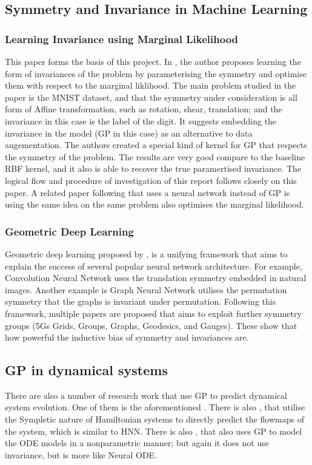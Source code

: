 \documentclass{statsmsc}
\begin{document}
\subsection{Symmetry and Invariance in Machine Learning}

\subsubsection{Learning Invariance using Marginal Likelihood}
This paper forms the basis of this project.
In \cite{Mark2017}, the author proposes learning the form of invariances of the problem by parameterising the symmetry and optimise them with respect to the marginal liklihood.
The main problem studied in the paper is the MNIST dataset, and that the symmetry under consideration is all form of Affine transformation, such as rotation, shear, translation; and the invariance in this case is the label of the digit. 
It suggests embedding the invariance in the model (GP in this case) as an alternative to data augementation.
The authors created a special kind of kernel for GP that respects the symmetry of the problem.
The results are very good compare to the baseline RBF kernel, and it also is able to recover the true paramertised invariance. 
The logical flow and procedure of investigation of this report follows closely on this paper. 
A related paper following that uses a neural network instead of GP is \cite{Tycho2021} using the same idea on the same problem also optimises the marginal likelihood.

\subsubsection{Geometric Deep Learning}
Geometric deep learning proposed by \cite{Bronstein2017}, is a unifying framework that aims to explain the success of several popular neural network architecture. 
For example, Convolution Neural Network uses the translation symmetry embedded in natural images. 
Another example is Graph Neural Network utilises the permutation symmetry that the graphs is invariant under permutation.
Following this framework, multiple papers are proposed that aims to exploit further symmetry groups (5Gs Grids, Groups, Graphs, Geodesics, and Gauges).
These show that how powerful the inductive bias of symmetry and invariances are.

\subsection{GP in dynamical systems}
There are also a number of research work that use GP to predict dynamical system evolution.
One of them is the aforementioned \cite{Raissi2018}.
There is also \cite{Rath2020}, that utilise the Sympletic nature of Hamiltonian systems to directly predict the flowmaps of the system, which is similar to HNN.
There is also \cite{Heinonen2018}, that also uses GP to model the ODE models in a nonparametric manner; but again it does not use invariance, but is more like Neural ODE. 
\end{document}
